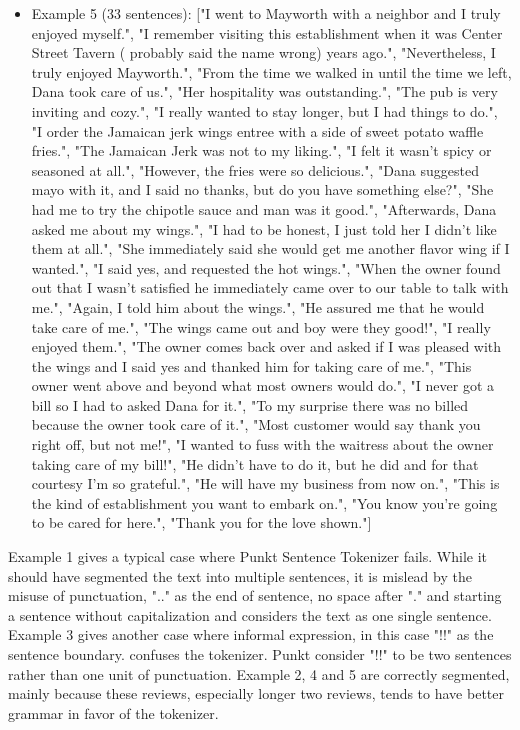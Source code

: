\documentclass[sigconf]{acmart}
\begin{document}
\begin{itemize}
\item{Example 5 (33 sentences)}: ["I went to Mayworth with a neighbor and I truly enjoyed myself.", "I remember visiting this establishment when it was Center Street Tavern ( probably said the name wrong) years ago.", "Nevertheless, I truly enjoyed Mayworth.", "From the time we walked in until the time we left,  Dana took care of us.", "Her hospitality was outstanding.", "The pub is very inviting and cozy.", "I really wanted to stay longer, but I had things to do.", "I order the Jamaican jerk wings entree with a side of sweet potato waffle fries.", "The Jamaican Jerk was not to my liking.", "I felt it wasn't spicy or seasoned at all.", "However, the fries were so delicious.", "Dana suggested mayo with it, and I said no thanks, but do you have something else?", "She had me to try the chipotle sauce and man was it good.", "Afterwards, Dana asked me about my wings.", "I had to be honest, I just told her I didn't like them at all.", "She immediately said she would get me another flavor wing if I wanted.", "I said yes, and requested the  hot wings.", "When the owner found out that I wasn't satisfied he immediately came over to our table to talk with me.", "Again, I told him about the wings.", "He assured me that he would take care of me.", "The wings came out and boy were they good!", "I really enjoyed them.", "The owner comes back over and asked if I was pleased with the wings and I said yes and thanked him for taking care of me.", "This owner went above and beyond what most owners would do.", "I never got a bill so I had to asked Dana for it.", "To my surprise there was no billed because the owner took care of it.", "Most customer would say thank you right off, but not me!", "I wanted to fuss with the waitress about the owner taking care of my bill!", "He didn't have to do it, but he did and for that courtesy I'm so grateful.", "He will have my business from now on.", "This is the kind of establishment you want to embark on.", "You know you're going to be cared for here.", "Thank you for the love shown."]
\end{itemize}

Example 1 gives a typical case where Punkt Sentence Tokenizer fails. While it should have segmented the text into multiple sentences, it is mislead by the misuse of punctuation, ".." as the end of sentence, no space after "." and starting a sentence without capitalization and considers the text as one single sentence. Example 3 gives another case where informal expression, in this case "!!" as the sentence boundary. confuses the tokenizer. Punkt consider "!!" to be two sentences rather than one unit of punctuation. Example 2, 4 and 5 are correctly segmented, mainly because these reviews, especially longer two reviews, tends to have better grammar in favor of the tokenizer.
\end{document}
